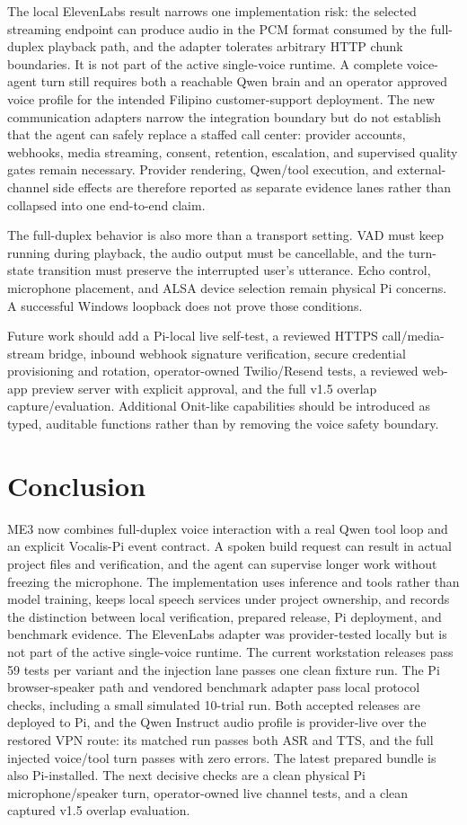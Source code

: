 \documentclass[sigconf,nonacm]{acmart}
\begin{document}
The local ElevenLabs result narrows one implementation risk: the selected
streaming endpoint can produce audio in the PCM format consumed by the
full-duplex playback path, and the adapter tolerates arbitrary HTTP chunk
boundaries. It is not part of the active single-voice runtime. A complete
voice-agent turn still requires both a reachable Qwen brain and an operator
approved voice profile for the intended Filipino customer-support deployment. The new
communication adapters narrow the integration boundary but do not establish
that the agent can safely replace a staffed call center: provider accounts,
webhooks, media streaming, consent, retention, escalation, and supervised
quality gates remain necessary. Provider rendering, Qwen/tool execution, and
external-channel side effects are therefore reported as separate evidence
lanes rather than collapsed into one end-to-end claim.

The full-duplex behavior is also more than a transport setting. VAD must keep
running during playback, the audio output must be cancellable, and the
turn-state transition must preserve the interrupted user's utterance. Echo
control, microphone placement, and ALSA device selection remain physical Pi
concerns. A successful Windows loopback does not prove those conditions.

Future work should add a Pi-local live self-test, a reviewed HTTPS
call/media-stream bridge, inbound webhook signature verification, secure
credential provisioning and rotation, operator-owned Twilio/Resend tests, a
reviewed web-app preview server with explicit approval, and the full v1.5
overlap capture/evaluation. Additional Onit-like capabilities should be
introduced as typed, auditable functions rather than by removing the voice
safety boundary.

\section{Conclusion}

\noindent ME3 now combines full-duplex voice interaction with a real Qwen tool loop and
an explicit Vocalis-Pi event contract. A
spoken build request can result in actual project files and verification, and
the agent can supervise longer work without freezing the microphone. The
implementation uses inference and tools rather than model training, keeps
local speech services under project ownership, and records the distinction
between local verification, prepared release, Pi deployment, and benchmark
evidence. The ElevenLabs adapter was provider-tested locally but is not part of
the active single-voice runtime. The current workstation releases pass 59 tests
per variant and the injection lane passes one clean fixture run. The Pi browser-speaker path and vendored
benchmark adapter pass local protocol checks, including a small simulated
10-trial run. Both accepted releases are deployed to Pi, and the Qwen Instruct audio profile is
provider-live over the restored VPN route: its matched run passes both ASR and
TTS, and the full injected voice/tool turn passes with zero errors. The latest
prepared bundle is also Pi-installed. The next decisive checks are a clean
physical Pi microphone/speaker turn, operator-owned live channel tests, and a
clean captured v1.5 overlap evaluation.
\end{document}
